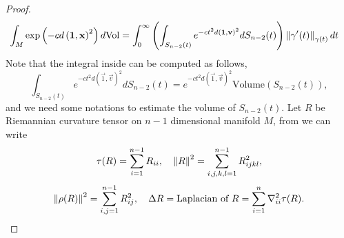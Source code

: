 \begin{proof}
\begin{equation}
\begin{split}
\int_M\exp\left(-cd\left(\mathbf{1},\mathbf{x}\right)^2\right)d\mathrm{Vol}&=\int_0^{\infty}\left(\int_{S_{n-2}(t)}e^{-ct^2d(\mathbf{1},\mathbf{v})^2}dS_{n-2}(t)\right)\left\Vert \gamma'(t) \right\Vert_{\gamma(t)}dt
\end{split}
\end{equation}
Note that the integral inside can be computed as follows,
\[
\int_{S_{n-2}(t)}e^{-ct^2d(\vec{1},\vec{v})^2}dS_{n-2}(t)=e^{-ct^2d(\vec{1},\vec{v})^2}\text{Volume}(S_{n-2}(t)),
\]
and we need some notations to estimate the volume of $S_{n-2}(t)$. Let $R$ be Riemannian curvature tensor on $n-1$ dimensional manifold $M$, from \cite{Alfred} we can write
\[
\tau(R)=\sum_{i=1}^{n-1}R_{ii}, \ \ \ \norm{R}^2=\sum_{i,j,k,l=1}^{n-1}R_{ijkl}^2,
\]
\[
\norm{\rho(R)}^2=\sum_{i,j=1}^{n-1}R_{ij}^2,\ \ \ \Delta R=\text{Laplacian of }R=\sum_{i=1}^n\nabla_{ii}^2\tau(R).
\]


\end{proof}
